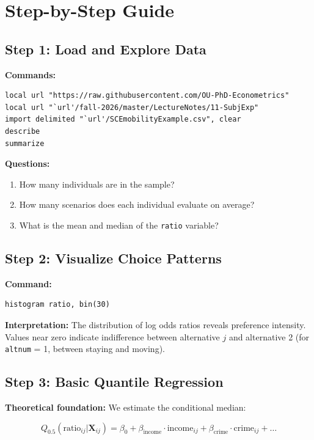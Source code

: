 \documentclass[12pt]{article}
\begin{document}
\section{Step-by-Step Guide}

\subsection{Step 1: Load and Explore Data}

\textbf{Commands:}
\begin{verbatim}
local url "https://raw.githubusercontent.com/OU-PhD-Econometrics"
local url "`url'/fall-2026/master/LectureNotes/11-SubjExp"
import delimited "`url'/SCEmobilityExample.csv", clear
describe
summarize
\end{verbatim}

\textbf{Questions:}
\begin{enumerate}
    \item How many individuals are in the sample?
    \item How many scenarios does each individual evaluate on average?
    \item What is the mean and median of the \texttt{ratio} variable?
\end{enumerate}

\subsection{Step 2: Visualize Choice Patterns}

\textbf{Command:}
\begin{verbatim}
histogram ratio, bin(30)
\end{verbatim}

\textbf{Interpretation:} The distribution of log odds ratios reveals preference intensity. Values near zero indicate indifference between alternative $j$ and alternative 2 (for \texttt{altnum} = 1, between staying and moving).

\subsection{Step 3: Basic Quantile Regression}

\textbf{Theoretical foundation:} We estimate the conditional median:

$$Q_{0.5}(\text{ratio}_{ij} | \mathbf{X}_{ij}) = \beta_0 + \beta_{\text{income}} \cdot \text{income}_{ij} + \beta_{\text{crime}} \cdot \text{crime}_{ij} + \ldots$$
\end{document}

